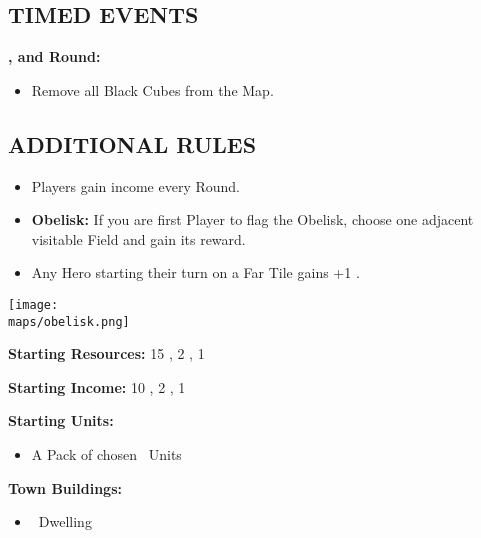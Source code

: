 \begin{multicols*}{2}
\subsection*{\MakeUppercase{Timed Events}}
\textbf{,  and  Round:}
\begin{itemize}
  \item Remove all Black Cubes from the Map.
\end{itemize}
\subsection*{\MakeUppercase{Additional Rules}}
\begin{itemize}
  \item Players gain income every Round.
  \item \textbf{Obelisk:} If you are first Player to flag the Obelisk, choose one adjacent visitable Field and gain its reward.
  \item Any Hero starting their turn on a Far Tile gains +1 .
\end{itemize}

\begin{center}
  \vfill
  \texttt{[image: \\maps/obelisk.png]}
  \vfill
\end{center}

\end{multicols*}

\textbf{Starting Resources:} 15 , 2 , 1 

\textbf{Starting Income:} 10 , 2 , 1 

\textbf{Starting Units:}
\begin{itemize}
  \item A Pack of chosen \bronze\ Units
\end{itemize}

\textbf{Town Buildings:}
\begin{itemize}
  \item \bronze\ Dwelling
\end{itemize}